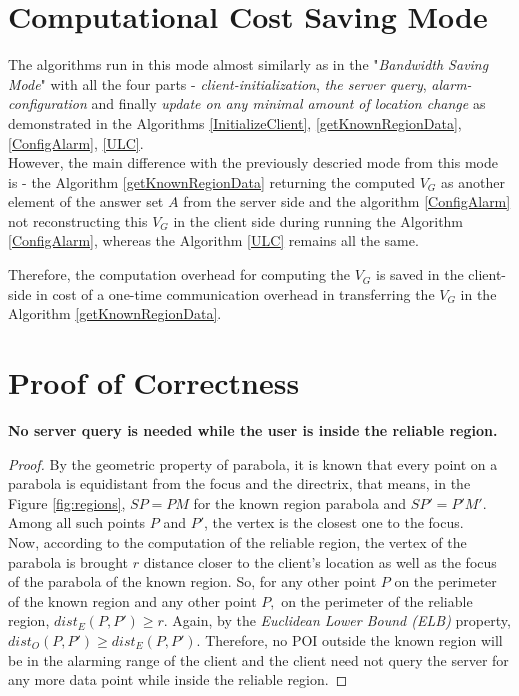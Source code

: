 \section{Computational Cost Saving Mode}
\label{CCS}
The algorithms run in this mode almost similarly as in the "\textit{Bandwidth Saving Mode}" with all the four parts - \textit{client-initialization}, \textit{the server query}, \textit{alarm-configuration} and finally \textit{update on any minimal amount of location change} as demonstrated in the Algorithms \ref{InitializeClient}, \ref{getKnownRegionData}, \ref{ConfigAlarm}, \ref{ULC}.\\

However, the main difference with the previously descried mode from this mode is - the Algorithm \ref{getKnownRegionData} returning the computed $V_G$ as another element of the answer set $A$ from the server side and the algorithm \ref{ConfigAlarm} not reconstructing this $V_G$ in the client side during running the Algorithm \ref{ConfigAlarm}, whereas the Algorithm \ref{ULC} remains all the same.

Therefore, the computation overhead for computing the $V_G$ is saved in the client-side in cost of a one-time communication overhead in transferring the $V_G$ in the Algorithm \ref{getKnownRegionData}.\\

\section{Proof of Correctness}
\label{ProofCort}
\textbf{No server query is needed while the user is inside the reliable region.}
\begin{proof}
By the geometric property of parabola, it is known that every point on a parabola is equidistant from the focus and the directrix, that means, in the Figure \ref{fig:regions}, $SP=PM$ for the known region parabola and $SP'=P'M'$. Among all such points $P$ and $P'$, the vertex is the closest one to the focus.\\
Now, according to the computation of the reliable region, the vertex of the parabola is brought $r$ distance closer to the client's location as well as the focus of the parabola of the known region. So, for any other point $P$ on the perimeter of the known region and any other point $P,$ on the perimeter of the reliable region, $dist_E(P, P') \geq r$. 
Again, by the \textit{Euclidean Lower Bound (ELB)} property, $dist_O(P, P') \geq dist_E(P, P')$. Therefore, no POI outside the known region will be in the alarming range of the client and the client need not query the server for any more data point while inside the reliable region.
\end{proof} 


